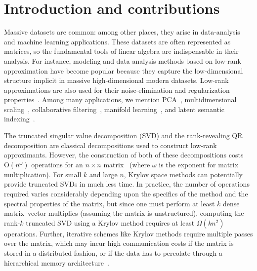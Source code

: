 
\chapter{Introduction and contributions}
\label{chintro}

Massive datasets are common: among other places, they arise in data-analysis and machine learning
applications. These datasets are often represented as matrices, so the fundamental tools of 
linear algebra are indispensable in their analysis. For instance, 
modeling and data analysis methods based on low-rank approximation have become popular 
because they capture the low-dimensional structure implicit in massive
high-dimensional modern datasets. Low-rank approximations are also used for
their noise-elimination and regularization properties~\cite{H90}. Among many
applications,  we mention PCA~\cite{HTF08}, multidimensional scaling~\cite{CC00},
collaborative filtering~\cite{SAJ10}, manifold learning~\cite{HLMS04}, and
latent semantic indexing~\cite{DDFLH90}. 

The truncated singular value decomposition (SVD) and the rank-revealing QR decomposition
are classical decompositions used to construct low-rank approximants. However, the construction
of both of these decompositions costs $\mathrm{O}(n^\omega)$ operations for an
$n \times n$ matrix~\cite{CH92} (where $\omega$ is the exponent for matrix multiplication). For small $k$ and
large $n$, Krylov space methods can potentially provide truncated SVDs in much
less time. In practice, the number of operations required varies considerably
depending upon the specifics of the method and the spectral properties of the
matrix, but since one must perform at least $k$ dense matrix--vector multiplies 
(assuming the matrix is unstructured), computing the rank-$k$ truncated SVD 
using a Krylov method requires at least
$\Omega(kn^2)$ operations. Further, iterative schemes like Krylov methods require 
multiple passes over the matrix, which may incur high communication costs if 
the matrix is stored in a distributed fashion, or if the data has to percolate
through a hierarchical memory architecture~\cite{CW09}.

